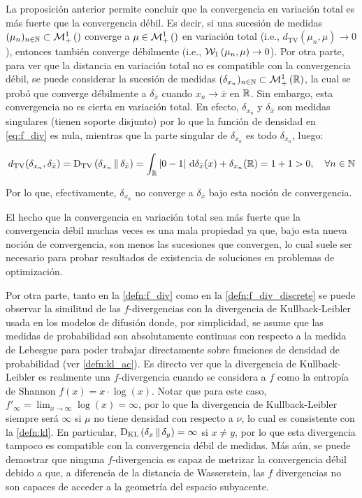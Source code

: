 La proposición anterior permite concluir que la convergencia en variación total es más fuerte que la convergencia débil. Es decir, si una sucesión de medidas $(\mu_n)_{n\in\mathbb{N}}\subset\mathcal{M}_+^1\left(\right)$ converge a $\mu\in\mathcal{M}_+^1\left(\right)$ en variación total (i.e., $d_{\operatorname{TV}}(\mu_n,\mu)\to 0$), entonces también converge débilmente (i.e., $\mathcal{W}_{1}\left(\mu_n,\mu\right)\to 0$). Por otra parte, para ver que la distancia en variación total no es compatible con la convergencia débil, se puede considerar la sucesión de medidas $(\delta_{x_n})_{n\in\mathbb{N}}\subset\mathcal{M}_+^1\left(\mathbb{R}\right)$, la cual se probó que converge débilmente a $\delta_{\bar x}$ cuando $x_n\to\bar x$ en $\mathbb{R}$. Sin embargo, esta convergencia no es cierta en variación total. En efecto, $\delta_{x_n}$ y $\delta_{\bar x}$ son medidas singulares (tienen soporte disjunto) por lo que la función de densidad en \eqref{eq:f_div} es nula, mientras que la parte singular de $\delta_{x_n}$ es todo $\delta_{x_n}$, luego:

\begin{equation*}
	d_{\operatorname{TV}}(\delta_{x_n},\delta_{\bar x})
	= \operatorname{D_{TV}}\left(\delta_{x_n}\,\|\,\delta_{\bar x}\right)
	= \int_{\mathbb{R}} |0 - 1| \,\operatorname{d}\!\delta_{\bar x}(x) + \delta_{x_n}(\mathbb{R})
	= 1 + 1 > 0,
	\quad\forall n\in\mathbb{N}
\end{equation*}

Por lo que, efectivamente, $\delta_{x_n}$ no converge a $\delta_{\bar x}$ bajo esta noción de convergencia.

El hecho que la convergencia en variación total sea más fuerte que la convergencia débil muchas veces es una mala propiedad ya que, bajo esta nueva noción de convergencia, son menos las sucesiones que convergen, lo cual suele ser necesario para probar resultados de existencia de soluciones en problemas de optimización.

Por otra parte, tanto en la \autoref{defn:f_div} como en la \autoref{defn:f_div_discrete} se puede observar la similitud de las $f$-divergencias con la divergencia de Kullback-Leibler usada en los modelos de difusión donde, por simplicidad, se asume que las medidas de probabilidad son absolutamente continuas con respecto a la medida de Lebesgue para poder trabajar directamente sobre funciones de densidad de probabilidad (ver \autoref{defn:kl_ac}). Es directo ver que la divergencia de Kullback-Leibler es realmente una $f$-divergencia cuando se considera a $f$ como la entropía de Shannon $f(x)=x\cdot\log(x)$. Notar que para este caso, $f'_\infty = \lim_{x\to\infty} \log(x) = \infty$, por lo que la divergencia de Kullback-Leibler siempre será $\infty$ si $\mu$ no tiene densidad con respecto a $\nu$, lo cual es consistente con la \autoref{defn:kl}. En particular, $\operatorname{D_{KL}}\left(\delta_x\,\|\,\delta_y\right)=\infty$ si $x\neq y$, por lo que esta divergencia tampoco es compatible con la convergencia débil de medidas. Más aún, se puede demostrar que ninguna $f$-divergencia es capaz de metrizar la convergencia débil debido a que, a diferencia de la distancia de Wasserstein, las $f$ divergencias no son capaces de acceder a la geometría del espacio subyacente.

